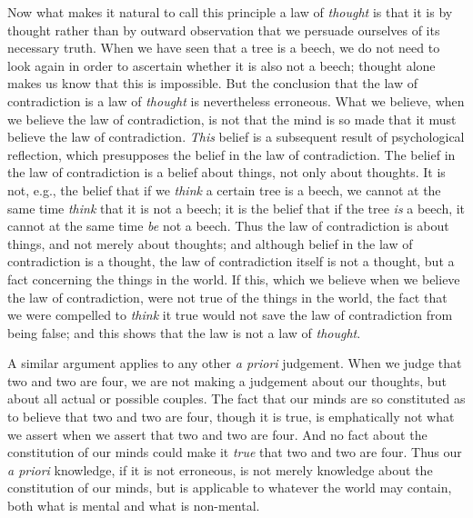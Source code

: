 \documentclass[oneside,letterpaper,12pt]{book}
\begin{document}
Now what makes it natural to call this principle a law of \emph{thought}
is that it is by thought rather than by outward observation that we
persuade ourselves of its necessary truth. When we have seen that a tree
is a beech, we do not need to look again in order to ascertain whether
it is also not a beech; thought alone makes us know that this is
impossible. But the conclusion that the law of contradiction is a law of
\emph{thought} is nevertheless erroneous. What we believe, when we
believe the law of contradiction, is not that the mind is so made that
it must believe the law of contradiction. \emph{This} belief is a
subsequent result of psychological reflection, which presupposes the
belief in the law of contradiction. The belief in the law of
contradiction is a belief about things, not only about thoughts. It is
not, e.g., the belief that if we \emph{think} a certain tree is a beech,
we cannot at the same time \emph{think} that it is not a beech; it is
the belief that if the tree \emph{is} a beech, it cannot at the same
time \emph{be} not a beech. Thus the law of contradiction is about
things, and not merely about thoughts; and although belief in the law of
contradiction is a thought, the law of contradiction itself is not a
thought, but a fact concerning the things in the world. If this, which
we believe when we believe the law of contradiction, were not true of
the things in the world, the fact that we were compelled to \emph{think}
it true would not save the law of contradiction from being false; and
this shows that the law is not a law of \emph{thought}.

A similar argument applies to any other \emph{a priori} judgement. When
we judge that two and two are four, we are not making a judgement about
our thoughts, but about all actual or possible couples. The fact that
our minds are so constituted as to believe that two and two are four,
though it is true, is emphatically not what we assert when we assert
that two and two are four. And no fact about the constitution of our
minds could make it \emph{true} that two and two are four. Thus our
\emph{a priori} knowledge, if it is not erroneous, is not merely
knowledge about the constitution of our minds, but is applicable to
whatever the world may contain, both what is mental and what is
non-mental.
\end{document}
